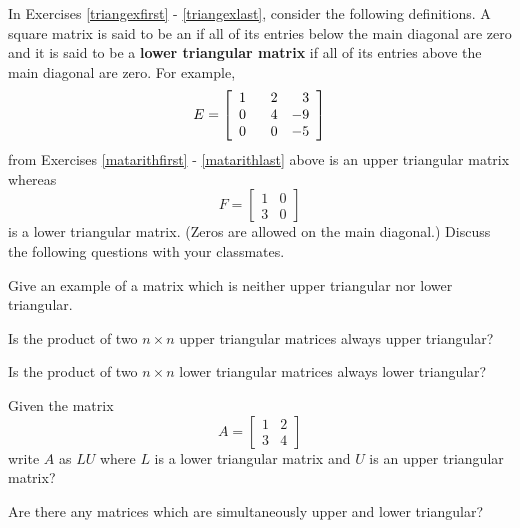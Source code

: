\documentclass{ximera}
\begin{document}
\begin{question}\label{triangularmatrices}
In Exercises \ref{triangexfirst} - \ref{triangexlast}, consider the following definitions. A square matrix is said to be an  if all of its entries below the main diagonal are zero and it is said to be a {\bf lower triangular matrix} if all of its entries above the main diagonal are zero. For example, \[E = \left[ \begin{array}{rrr} 1 & \hphantom{-}2 & 3 \\ 0 & 4 & -9 \\ 0 & 0 & -5 \end{array} \right]\] from Exercises \ref{matarithfirst} - \ref{matarithlast} above is an upper triangular matrix whereas \[F = \left[ \begin{array}{rr} 1 & 0 \\ 3 & 0 \end{array} \right]\] is a lower triangular matrix.  (Zeros are allowed on the main diagonal.)  Discuss the following questions with your classmates.

\begin{problem}\label{triangexfirst} 
Give an example of a matrix which is neither upper triangular nor lower triangular.
\end{problem}

\begin{problem}
Is the product of two $n \times n$ upper triangular matrices always upper triangular?
\end{problem}

\begin{problem}
Is the product of two $n \times n$ lower triangular matrices always lower triangular?
\end{problem}

\begin{problem}
Given the matrix \[A = \left[ \begin{array}{rr} 1 & 2 \\ 3 & 4 \end{array} \right]\] write $A$ as $LU$ where $L$ is a lower triangular matrix and $U$ is an upper triangular matrix?
\end{problem}

\begin{problem}\label{triangexlast}
Are there any matrices which are simultaneously upper and lower triangular? 
\end{problem}

\end{question}
\end{document}
